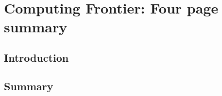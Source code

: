  
\chapter{Computing Frontier: Four page summary}
\label{chap:mag}


\begin{center}\begin{boldmath}

%

\end{boldmath}\end{center}


\section{Introduction}
\label{sec:comp-intro}





\section{Summary}
\label{sec:comp-summary}




